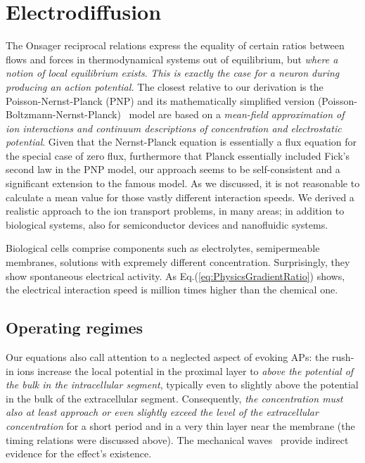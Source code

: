 \section{Electrodiffusion\label{sec:Physiology-Electrodiffusion}}


The Onsager reciprocal relations express the equality of certain ratios between flows and forces in \hypertarget{ThermodynamicalSystems}{thermodynamical systems} out of equilibrium, but \textit{where a notion of local equilibrium exists}. \textit{This is exactly the case for a neuron during producing an action potential.} The closest relative to our derivation is the Poisson-Nernst-Planck (PNP) and its mathematically simplified version (Poisson-Boltzmann-Nernst-Planck)~\cite{Poisson-Boltzmann-Nernst-Planck:2011} model are based on a \textit{mean-field approximation of ion interactions and continuum descriptions of concentration and electrostatic potential}. Given that the Nernst-Planck equation is essentially a flux equation for the 
special case of zero flux, furthermore that Planck essentially included Fick's second law in the PNP model, our approach seems to be self-consistent
and a significant extension to the famous model. 
As we discussed,
it is not reasonable to calculate a mean value for those vastly different
interaction speeds. We derived a realistic approach
to the ion transport problems,  in many areas; in addition to  biological systems, also for semiconductor devices and nanofluidic systems.



Biological cells comprise components such as electrolytes, semipermeable 
membranes, solutions with expremely different concentration.
Surprisingly, they show spontaneous electrical activity.
As Eq.(\ref{eq:PhysicsGradientRatio}) shows, the electrical interaction
speed is million times higher than the chemical one. 


\subsection{Operating regimes\label{sec:Physiology-OperatingRegimes}}

Our equations also call attention to a neglected aspect of evoking
APs: the rush-in ions increase the local potential in the proximal
layer to \emph{above the potential of the bulk in the intracellular
segment}, typically even to slightly above the potential in the bulk
of the extracellular segment. Consequently, \emph{the concentration
must also at least approach or even slightly exceed the level of the
extracellular concentration} for a short period and in a very thin
layer near the membrane (the timing relations were discussed above).
The mechanical waves~\cite{MechanicalWaves:2015} provide indirect
evidence for the effect's existence.

